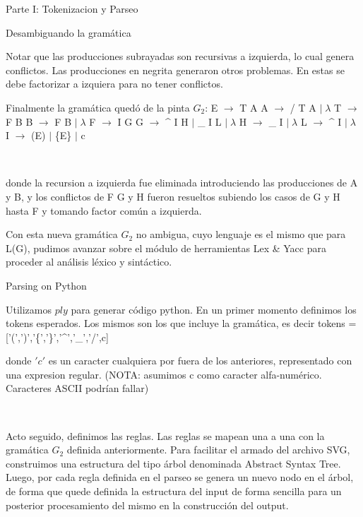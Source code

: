 \begin{section}{Parte I: Tokenizacion y Parseo}
\begin{subsection}{Desambiguando la gram\'atica}
~

Notar que las producciones subrayadas son recursivas a izquierda, lo cual genera conflictos. 
Las producciones en negrita generaron otros problemas. En estas se debe factorizar a izquiera para no tener conflictos.

Finalmente la gram\'atica qued\'o de la pinta $G_{2}$:
\newline E $\rightarrow$ T A
\newline A $\rightarrow$ / T A $| \; \lambda$
\newline T $\rightarrow$ F B
\newline B $\rightarrow$ F B $| \; \lambda$
\newline F $\rightarrow$ I G
\newline G $\rightarrow$ \^{} I H $|$ \_ I L $| \; \lambda$
\newline H $\rightarrow$ \_ I $| \; \lambda$
\newline L $\rightarrow$ \^{} I $| \; \lambda$
\newline I $\rightarrow$ (E) $|$ \{E\} $|$ c
  
~

donde la recursion a izquierda fue eliminada introduciendo las producciones de A y B, y los conflictos de F G y H fueron resueltos subiendo los casos de G y H hasta F y tomando factor com\'un a izquierda.

Con esta nueva gram\'atica $G_{2}$ no ambigua, cuyo lenguaje es el mismo que para L(G), pudimos avanzar sobre el m\'odulo de herramientas Lex \& Yacc para proceder al an\'alisis l\'exico y sint\'actico.

\end{subsection}
\begin{subsection}{Parsing on Python}

Utilizamos $ply$ para generar c\'odigo python. En un primer momento definimos los tokens esperados. Los mismos son los que incluye la gram\'atica, es decir tokens = ['(',')','\{','\}','\^{}','\_','/',c]

donde $'c'$ es un caracter cualquiera por fuera de los anteriores, representado con una expresion regular. (NOTA: asumimos c como caracter alfa-num\'erico. Caracteres ASCII podr\'ian fallar)

~

Acto seguido, definimos las reglas. Las reglas se mapean una a una con la gram\'atica $G_2$ definida anteriormente. 
Para facilitar el armado del archivo SVG, construimos una estructura del tipo \'arbol denominada Abstract Syntax Tree. Luego, por cada regla definida en el parseo se genera un nuevo nodo en el \'arbol, de forma que quede definida la estructura del input de forma sencilla para un posterior procesamiento del mismo en la construcci\'on del output.


\end{subsection}
\end{section}

